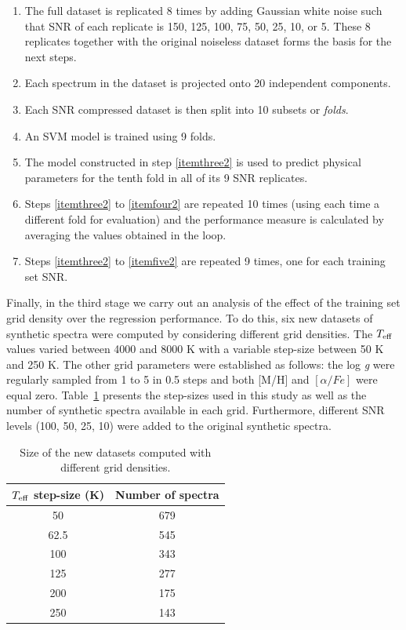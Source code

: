 \documentclass[a4paper,fleqn,usenatbib]{mnras}
\begin{document}
{{{\begin{enumerate}
\item The full dataset is replicated 8 times by adding Gaussian white
  noise such that SNR of each replicate is 150, 125, 100, 75, 50, 25,
  10, or 5. These 8 replicates together with the original noiseless
  dataset forms the basis for the next steps.
\item Each spectrum in the dataset is projected onto 20
  independent components.
\item Each SNR compressed dataset is then split into 10 subsets or
  \textit{folds}.
\item \label{itemthree2} An SVM model is trained using 9 folds.
\item \label{itemfour2} The model constructed in step \ref{itemthree2}
  is used to predict physical parameters for the tenth fold in all of
  its 9 SNR replicates.
\item \label{itemfive2} Steps \ref{itemthree2} to \ref{itemfour2} are
  repeated 10 times (using each time a different fold for evaluation)
  and the performance measure is calculated by averaging the values
  obtained in the loop.
\item Steps \ref{itemthree2} to \ref{itemfive2} are repeated 9 times,
  one for each training set SNR.
\end{enumerate}

Finally, in the third stage we carry out an analysis of the effect of
the training set grid density over the regression performance.  To do
this, six new datasets of synthetic spectra were computed by
considering different grid densities. The $T_{\rm eff}$ values
varied between 4000 and 8000 K with a variable step-size between 50 K
and 250 K. The other grid parameters were established as follows: the
log \textit{g} were regularly sampled from 1 to 5 in 0.5 steps and
both [M/H] and $\left[ \alpha/Fe \right]$ were equal
zero. Table~\ref{tab:grid} presents the step-sizes used in this study
as well as the number of synthetic spectra available in each grid.
Furthermore, different SNR levels (100, 50, 25, 10) were added to the
original synthetic spectra.

\begin{table}
\centering
\caption{Size of the new datasets computed with different grid densities.}
\label{tab:grid}
\begin{tabular}{c c}
\hline
\textbf{$T_{\rm eff}$ step-size (K)} & \textbf{Number of spectra} \\
\hline
50 & 679 \\
62.5 & 545 \\
100 & 343 \\
125 & 277 \\
200 & 175\\
250 & 143\\
\hline
\end{tabular}
\end{table}

}}}
\end{document}
